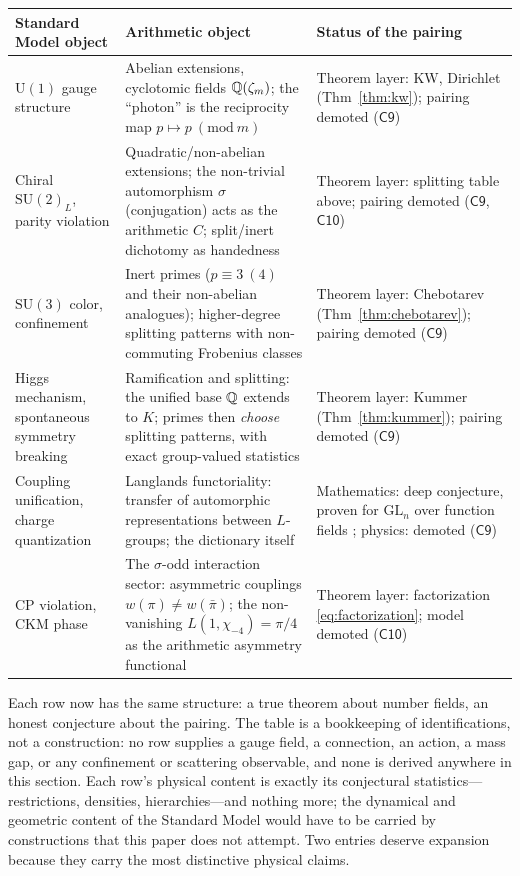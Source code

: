 \begin{center}
\begin{tabular}{@{}p{}p{}p{}@{}}
\toprule
Standard Model object & Arithmetic object & Status of the pairing\\
\midrule
$\mathrm{U}(1)$ gauge structure &
Abelian extensions, cyclotomic fields $\mathbb{Q}(\zeta_{m})$; the ``photon'' is the reciprocity
map $p\mapsto p\ (\mathrm{mod}\ m)$ &
Theorem layer: KW, Dirichlet (Thm~\ref{thm:kw}); pairing demoted ($\mathsf{C9}$)\\
Chiral $\mathrm{SU}(2)_{L}$, parity violation &
Quadratic/non-abelian extensions; the non-trivial automorphism $\sigma$ (conjugation) acts
as the arithmetic $C$; split/inert dichotomy as handedness &
Theorem layer: splitting table above; pairing demoted ($\mathsf{C9}$, $\mathsf{C10}$)\\
$\mathrm{SU}(3)$ color, confinement &
Inert primes ($p\equiv3\ (4)$ and their non-abelian analogues); higher-degree splitting
patterns with non-commuting Frobenius classes &
Theorem layer: Chebotarev (Thm~\ref{thm:chebotarev}); pairing demoted ($\mathsf{C9}$)\\
Higgs mechanism, spontaneous symmetry breaking &
Ramification and splitting: the unified base $\mathbb{Q}$ extends to $K$; primes then
\emph{choose} splitting patterns, with exact group-valued statistics &
Theorem layer: Kummer (Thm~\ref{thm:kummer}); pairing demoted ($\mathsf{C9}$)\\
Coupling unification, charge quantization &
Langlands functoriality: transfer of automorphic representations between $L$-groups;
the dictionary itself &
Mathematics: deep conjecture, proven for $\mathrm{GL}_{n}$ over function fields
\cite{lafforgue2002}; physics: demoted ($\mathsf{C9}$)\\
CP violation, CKM phase &
The $\sigma$-odd interaction sector: asymmetric couplings
$w(\pi)\neq w(\bar\pi)$; the non-vanishing $L(1,\chi_{-4})=\pi/4$ as the arithmetic
asymmetry functional &
Theorem layer: factorization \eqref{eq:factorization}; model demoted ($\mathsf{C10}$)\\
\bottomrule
\end{tabular}
\end{center}

Each row now has the same structure: a true theorem about number fields, an honest
conjecture about the pairing. The table is a bookkeeping of identifications, not a
construction: no row supplies a gauge field, a connection, an action, a mass gap, or any
confinement or scattering observable, and none is derived anywhere in this section. Each
row's physical content is exactly its conjectural statistics---restrictions, densities,
hierarchies---and nothing more; the dynamical and geometric content of the Standard Model
would have to be carried by constructions that this paper does not attempt. Two entries
deserve expansion because they carry the
most distinctive physical claims.

